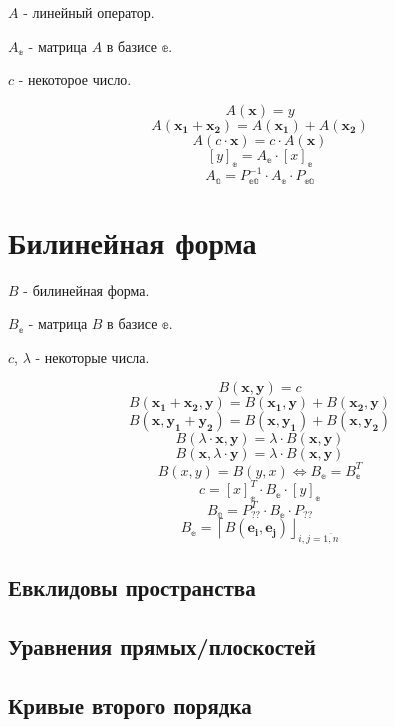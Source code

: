 $A$ - линейный оператор.

$A_\mathbb{e}$ - матрица $A$ в базисе $\mathbb{e}$.

$c$ - некоторое число.
 
$$ A(\boldsymbol{x}) = y $$
$$ A(\boldsymbol{x_1} + \boldsymbol{x_2}) = A(\boldsymbol{x_1}) + A(\boldsymbol{x_2}) $$
$$ A(c\cdot\boldsymbol{x}) = c\cdot A(\boldsymbol{x}) $$
$$ [y]_\mathbb{e} = A_\mathbb{e} \cdot [x]_\mathbb{e} $$
$$ A_\mathbb{a} = P_\mathbb{ea}^{-1} \cdot A_\mathbb{e} \cdot P_\mathbb{ea} $$

\section{Билинейная форма}

$B$ - билинейная форма.

$B_\mathbb{e}$ - матрица $B$ в базисе $\mathbb{e}$.

$c$, $\lambda$ - некоторые числа.

$$ B(\boldsymbol{x}, \boldsymbol{y}) = c$$
$$ B(\boldsymbol{x_1} + \boldsymbol{x_2}, \boldsymbol{y}) = B(\boldsymbol{x_1}, \boldsymbol{y}) + B(\boldsymbol{x_2}, \boldsymbol{y}) $$
$$ B(\boldsymbol{x}, \boldsymbol{y_1} + \boldsymbol{y_2}) = B(\boldsymbol{x}, \boldsymbol{y_1}) + B(\boldsymbol{x}, \boldsymbol{y_2}) $$
$$ B(\lambda\cdot \boldsymbol{x}, \boldsymbol{y}) =  \lambda\cdot B(\boldsymbol{x}, \boldsymbol{y})$$
$$ B(\boldsymbol{x}, \lambda\cdot \boldsymbol{y}) =  \lambda\cdot B(\boldsymbol{x}, \boldsymbol{y})$$
$$ B(x, y) = B(y, x) \Leftrightarrow B_\mathbb{e} = B_\mathbb{e}^T $$
$$ c = [x]_\mathbb{e}^T \cdot B_\mathbb{e} \cdot [y]_\mathbb{e} $$
$$ B_\mathbb{a} = P_\mathbb{??}^T \cdot B_\mathbb{e} \cdot P_\mathbb{??} $$
$$ B_\mathbb{e} = \left\lceil B(\boldsymbol{e_i},\boldsymbol{e_j})\right\rfloor_{i,j=\overline{1,n}} $$

\subsection{Евклидовы пространства}

\subsection{Уравнения прямых/плоскостей}

\subsection{Кривые второго порядка}

